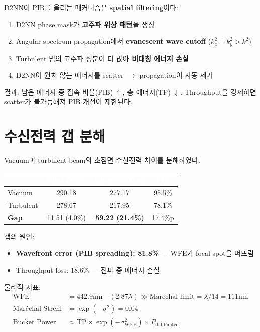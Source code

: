 \documentclass[11pt,a4paper]{article}
\begin{document}
D2NN이 PIB를 올리는 메커니즘은 \textbf{spatial filtering}이다:

\begin{enumerate}
\item D2NN phase mask가 \textbf{고주파 위상 패턴}을 생성
\item Angular spectrum propagation에서 \textbf{evanescent wave cutoff} ($k_x^2 + k_y^2 > k^2$)
\item Turbulent 빔의 고주파 성분이 더 많아 \textbf{비대칭 에너지 손실}
\item D2NN이 원치 않는 에너지를 scatter $\rightarrow$ propagation이 자동 제거
\end{enumerate}

\noindent 결과: 남은 에너지 중 집속 비율(PIB) $\uparrow$, 총 에너지(TP) $\downarrow$.
Throughput을 강제하면 scatter가 불가능해져 PIB 개선이 제한된다.


\section{수신전력 갭 분해}

Vacuum과 turbulent beam의 초점면 수신전력 차이를 분해하였다.

\begin{table}[H]
\centering
\begin{tabular}{lccc}
\toprule
\rowcolor{tableheader}\textcolor{white}{} & \textcolor{white}{\textbf{Total Power}} & \textcolor{white}{\textbf{Bucket@10$\mu$m}} & \textcolor{white}{\textbf{PIB}} \\
\midrule
Vacuum & 290.18 & 277.17 & 95.5\% \\
\rowcolor{tablealt}Turbulent & 278.67 & 217.95 & 78.1\% \\
\textbf{Gap} & 11.51 (4.0\%) & \textbf{59.22 (21.4\%)} & 17.4\%p \\
\bottomrule
\end{tabular}
\end{table}

\noindent 갭의 원인:
\begin{itemize}
\item \textbf{Wavefront error (PIB spreading): 81.8\%} --- WFE가 focal spot을 퍼뜨림
\item Throughput loss: 18.6\% --- 전파 중 에너지 손실
\end{itemize}

\noindent 물리적 지표:
\begin{align*}
\text{WFE} &= 442.9\text{nm} \quad (2.87\lambda) \gg \text{Mar\'{e}chal limit} = \lambda/14 = 111\text{nm} \\
\text{Mar\'{e}chal Strehl} &= \exp(-\sigma^2) = 0.04 \\
\text{Bucket Power} &\approx \text{TP} \times \exp(-\sigma^2_{\text{WFE}}) \times P_{\text{diff.limited}}
\end{align*}
\end{document}

